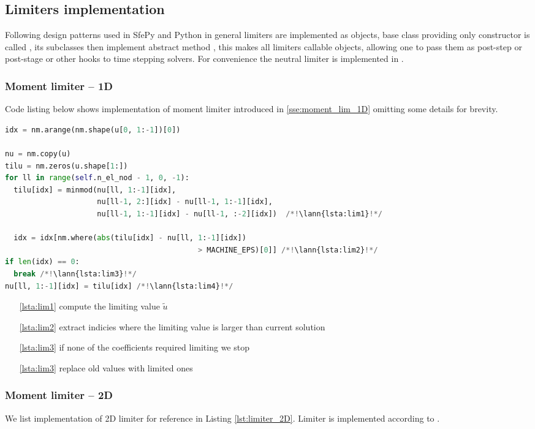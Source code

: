 \subsection{Limiters implementation}
Following design patterns used in SfePy and Python in general limiters are implemented as objects, base class providing 
only constructor is called , its subclasses then implement abstract 
method , this makes all limiters callable objects, allowing one to pass 
them as post-step or post-stage or other hooks to time stepping solvers. For convenience 
the neutral limiter is implemented in .

\subsubsection{Moment limiter -- 1D}
\label{se:i_moment_lim_1D}
Code listing below shows implementation of moment limiter introduced in \ref{sse:moment_lim_1D} omitting some details 
for brevity.
\setcounter{lstannotation}{0}
\begin{lstlisting}[language=Python, caption=Moment limiter for 1D]
idx = nm.arange(nm.shape(u[0, 1:-1])[0])

nu = nm.copy(u)
tilu = nm.zeros(u.shape[1:])
for ll in range(self.n_el_nod - 1, 0, -1):
  tilu[idx] = minmod(nu[ll, 1:-1][idx], 
                     nu[ll-1, 2:][idx] - nu[ll-1, 1:-1][idx],
					 nu[ll-1, 1:-1][idx] - nu[ll-1, :-2][idx])  /*!\lann{lsta:lim1}!*/

  idx = idx[nm.where(abs(tilu[idx] - nu[ll, 1:-1][idx])
											> MACHINE_EPS)[0]] /*!\lann{lsta:lim2}!*/
if len(idx) == 0:
  break /*!\lann{lsta:lim3}!*/
nu[ll, 1:-1][idx] = tilu[idx] /*!\lann{lsta:lim4}!*/
\end{lstlisting}
\begin{itemize}
	\item [\ref{lsta:lim1}] compute the limiting value $\tilde{u}$
	\item [\ref{lsta:lim2}] extract indicies where the limiting value is larger than 
	current solution
	\item[\ref{lsta:lim3}] if none of the coefficients required limiting we stop
    \item [\ref{lsta:lim3}] replace old values with limited ones
	
\end{itemize}

\subsubsection{Moment limiter -- 2D}
\label{se:i_moment_lim_2D}
We list implementation of 2D limiter for reference in Listing \ref{lst:limiter_2D}. Limiter is implemented according to .


